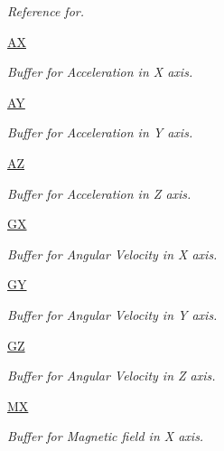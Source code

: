 \begin{DoxyCompactItemize}
\begin{DoxyCompactList}\small\item\em Reference for. \end{DoxyCompactList}\item 
\hyperlink{classmain_1_1_main_window_a4bc63f3f953ad9110ea895e0b277e263}{A\-X}
\begin{DoxyCompactList}\small\item\em Buffer for Acceleration in X axis. \end{DoxyCompactList}\item 
\hyperlink{classmain_1_1_main_window_a0dd8435606fc6f9398de1c3759a5253e}{A\-Y}
\begin{DoxyCompactList}\small\item\em Buffer for Acceleration in Y axis. \end{DoxyCompactList}\item 
\hyperlink{classmain_1_1_main_window_aab50e3554ab90b750539200250578e0b}{A\-Z}
\begin{DoxyCompactList}\small\item\em Buffer for Acceleration in Z axis. \end{DoxyCompactList}\item 
\hyperlink{classmain_1_1_main_window_af9250994236464e4aa37faf090fa52b8}{G\-X}
\begin{DoxyCompactList}\small\item\em Buffer for Angular Velocity in X axis. \end{DoxyCompactList}\item 
\hyperlink{classmain_1_1_main_window_af19db177442479dc778051475277ee8b}{G\-Y}
\begin{DoxyCompactList}\small\item\em Buffer for Angular Velocity in Y axis. \end{DoxyCompactList}\item 
\hyperlink{classmain_1_1_main_window_aa03dbf9da18079ab07a57ebf5e523b58}{G\-Z}
\begin{DoxyCompactList}\small\item\em Buffer for Angular Velocity in Z axis. \end{DoxyCompactList}\item 
\hyperlink{classmain_1_1_main_window_a6ab8008a1a68f64ee8b6598a98654812}{M\-X}
\begin{DoxyCompactList}\small\item\em Buffer for Magnetic field in X axis. \end{DoxyCompactList}\item 

\end{DoxyCompactItemize}
